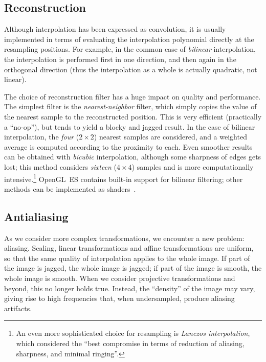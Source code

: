 \documentclass[english,12pt]{ifimaster}
\begin{document}

\subsection{Reconstruction}
\label{sec:filter}

Although interpolation has been expressed as convolution, it is
usually implemented in terms of evaluating the interpolation
polynomial directly at the resampling positions. For example, in the
common case of \emph{bilinear} interpolation, the interpolation is
performed first in one direction, and then again in the orthogonal
direction (thus the interpolation as a whole is actually quadratic,
not linear).

The choice of reconstruction filter has a huge impact on quality and
performance. The simplest filter is the \emph{nearest-neighbor}
filter, which simply copies the value of the nearest sample to the
reconstructed position. This is very efficient (practically a
``no-op''), but tends to yield a blocky and jagged result. In the case
of bilinear interpolation, the \emph{four} ($2 \times 2$) nearest
samples are considered, and a weighted average is computed according
to the proximity to each. Even smoother results can be obtained with
\emph{bicubic} interpolation, although some sharpness of edges gets
lost; this method considers \emph{sixteen} ($4 \times 4$) samples and
is more computationally intensive.\footnote{An even more sophisticated
  choice for resampling is \emph{Lanczos interpolation}, which
  \citet{turkowski90:-graph-gems} considered the ``best compromise in
  terms of reduction of aliasing, sharpness, and minimal ringing''.}
OpenGL~ES contains built-in support for bilinear filtering; other
methods can be implemented as shaders~\citep{bjorke04:-filter}.


\subsection{Antialiasing}
\label{sec:prefilter}

As we consider more complex transformations, we encounter a new
problem: aliasing. Scaling, linear transformations and affine
transformations are uniform, so that the same quality of interpolation
applies to the whole image. If part of the image is jagged, the whole
image is jagged; if part of the image is smooth, the whole image is
smooth. When we consider projective transformations and beyond, this
no longer holds true. Instead, the ``density'' of the image may vary,
giving rise to high frequencies that, when undersampled, produce
aliasing artifacts.
\end{document}
